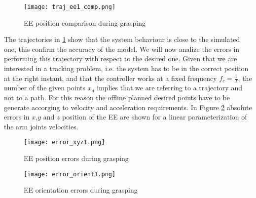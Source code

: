 	\begin{figure}[h!]
	\centering
	\texttt{[image: traj\_ee1\_comp.png]}
	\caption{EE position comparison during grasping}
	\label{traj_ee1_comp}
	\end{figure}
	The trajectories in \ref{traj_ee1_comp} show that the system behaviour is close to the simulated one, this confirm the accuracy of the model. We will now analize the errors in performing this trajectory with respect to the desired one.  
	Given that we are interested in a tracking problem, i.e. the system has to be in the correct position at the right instant, and that the controller works at a fixed frequency $f_c=\frac{1}{T}$, the number of the given points $x_d$ implies that we are referring to a trajectory and not to a path. For this reason the offline planned desired points have to be generate accorging to velocity and acceleration requirements. 
	In Figure \ref{error_xyz1} absolute errors in $x$,$y$ and $z$ position of the EE are shown for a linear parameterization of the arm joints velocities.
	\begin{figure}[h!]
	\centering
	\texttt{[image: error\_xyz1.png]}
	\caption{EE position errors during grasping}
	\label{error_xyz1}
	\end{figure}
	\begin{figure}[h!]
	\centering
	\texttt{[image: error\_orient1.png]}
	\caption{EE orientation errors during grasping}
	\label{error_orient1}
	\end{figure}


